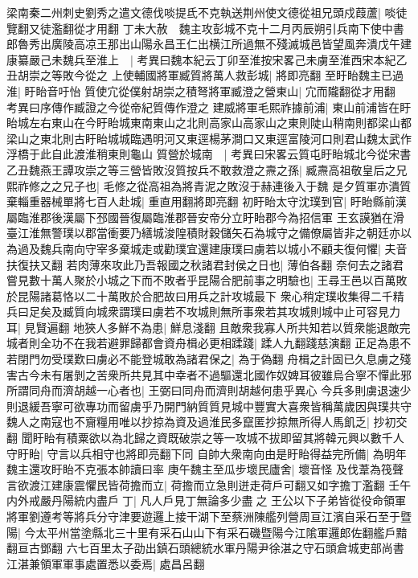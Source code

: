 梁南秦二州刺史劉秀之遣文德伐啖提氐不克執送荆州使文德從祖兄頭戍葭蘆|{
	啖徒覽翻又徒濫翻從才用翻}
丁未大赦　魏主攻彭城不克十二月丙辰朔引兵南下使中書郎魯秀出廣陵高凉王那出山陽永昌王仁出横江所過無不殘滅城邑皆望風奔潰戊午建康纂嚴己未魏兵至淮上　|{
	考異曰魏本紀云丁卯至淮按宋畧己未虜至淮西宋本紀乙丑胡崇之等敗今從之}
上使輔國將軍臧質將萬人救彭城|{
	將即亮翻}
至盱眙魏主已過淮|{
	盱眙音吁怡}
質使宂從僕射胡崇之積弩將軍臧澄之營東山|{
	宂而隴翻從才用翻　考異曰序傳作臧證之今從帝紀質傳作澄之}
建威將軍毛熙祚據前浦|{
	東山前浦皆在盱眙城左右東山在今盱眙城東南東山之北則高家山高家山之東則陡山稍南則都梁山都梁山之東北則古盱眙城城臨遇明河又東逕楊茅澗口又東逕富陵河口則君山魏太武作浮橋于此自此渡淮稍東則龜山}
質營於城南　|{
	考異曰宋畧云質屯盱眙城北今從宋書}
乙丑魏燕王譚攻崇之等三營皆敗沒質按兵不敢救澄之燾之孫|{
	臧燾高祖敬皇后之兄}
熙祚修之之兄子也|{
	毛修之從高祖為將青泥之敗沒于赫連後入于魏}
是夕質軍亦潰質棄輜重器械單將七百人赴城|{
	重直用翻將即亮翻}
初盱眙太守沈璞到官|{
	盱眙縣前漢屬臨淮郡後漢屬下邳國晉復屬臨淮郡晉安帝分立盱眙郡今為招信軍}
王玄謨猶在滑臺江淮無警璞以郡當衝要乃繕城浚隍積財穀儲矢石為城守之備僚屬皆非之朝廷亦以為過及魏兵南向守宰多棄城走或勸璞宜還建康璞曰虜若以城小不顧夫復何懼|{
	夫音扶復扶又翻}
若肉薄來攻此乃吾報國之秋諸君封侯之日也|{
	薄伯各翻}
奈何去之諸君嘗見數十萬人聚於小城之下而不敗者乎昆陽合肥前事之明驗也|{
	王尋王邑以百萬敗於昆陽諸葛恪以二十萬敗於合肥故曰用兵之計攻城最下}
衆心稍定璞收集得二千精兵曰足矣及臧質向城衆謂璞曰虜若不攻城則無所事衆若其攻城則城中止可容見力耳|{
	見賢遍翻}
地狹人多鮮不為患|{
	鮮息淺翻}
且敵衆我寡人所共知若以質衆能退敵完城者則全功不在我若避罪歸都會資舟楫必更相蹂踐|{
	蹂人九翻踐慈演翻}
正足為患不若閉門勿受璞歎曰虜必不能登城敢為諸君保之|{
	為于偽翻}
舟楫之計固已久息虜之殘害古今未有屠剝之苦衆所共見其中幸者不過驅還北國作奴婢耳彼雖烏合寧不憚此邪所謂同舟而濟胡越一心者也|{
	王弼曰同舟而濟則胡越何患乎異心}
今兵多則虜退速少則退緩吾寧可欲專功而留虜乎乃開門納質質見城中豐實大喜衆皆稱萬歲因與璞共守魏人之南寇也不齎糧用唯以抄掠為資及過淮民多竄匿抄掠無所得人馬飢乏|{
	抄初交翻}
聞盱眙有積粟欲以為北歸之資既破崇之等一攻城不拔即留其將韓元興以數千人守盱眙|{
	守言以兵相守也將即亮翻下同}
自帥大衆南向由是盱眙得益完所備|{
	為明年魏主還攻盱眙不克張本帥讀曰率}
庚午魏主至瓜步壞民廬舍|{
	壞音怪}
及伐葦為筏聲言欲渡江建康震懼民皆荷擔而立|{
	荷擔而立急則迸走荷戶可翻又如字擔丁濫翻}
壬午内外戒嚴丹陽統内盡戶丁|{
	凡人戶見丁無論多少盡之}
王公以下子弟皆從役命領軍將軍劉遵考等將兵分守津要遊邏上接干湖下至蔡洲陳艦列營周亘江濱自采石至于暨陽|{
	今太平州當塗縣北三十里有采石山山下有采石磯暨陽今江隂軍邏郎佐翻艦戶黯翻亘古鄧翻}
六七百里太子劭出鎮石頭總統水軍丹陽尹徐湛之守石頭倉城吏部尚書江湛兼領軍軍事處置悉以委焉|{
	處昌呂翻}
